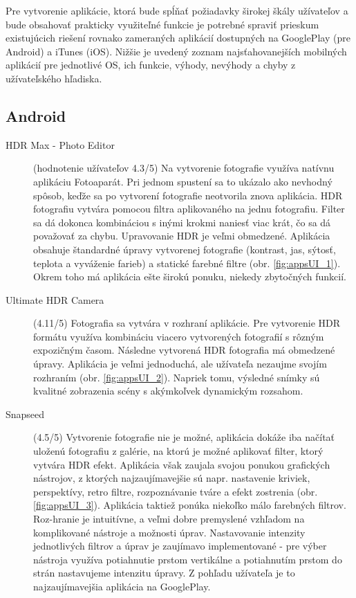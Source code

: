 Pre vytvorenie aplikácie, ktorá bude spĺňať požiadavky širokej škály užívateľov
a bude obsahovať prakticky využiteľné funkcie je potrebné spraviť prieskum existujúcich riešení
rovnako zameraných aplikácií dostupných na GooglePlay (pre Android) a iTunes (iOS).
Nižšie je uvedený zoznam najsťahovanejších mobilných aplikácií pre jednotlivé OS, ich funkcie, výhody,
nevýhody a chyby z užívateľského hľadiska.

\subsection*{Android}

\begin{description}
    \item [HDR Max - Photo Editor] (hodnotenie užívateľov 4.3/5)
    Na vytvorenie fotografie využíva natívnu aplikáciu Fotoaparát. Pri jednom spustení sa to ukázalo ako
    nevhodný spôsob, keďže sa po vytvorení fotografie neotvorila znova aplikácia. HDR fotografiu vytvára 
    pomocou filtra aplikovaného na jednu fotografiu. Filter sa dá dokonca kombináciou s inými krokmi naniesť 
    viac krát, čo sa dá považovať za chybu. Upravovanie HDR je veľmi obmedzené. Aplikácia obsahuje štandardné 
    úpravy vytvorenej fotografie (kontrast, jas, sýtosť, teplota a vyváženie farieb) a statické farebné filtre
    (obr. \ref{fig:appsUI_1}). Okrem toho má aplikácia ešte širokú ponuku, niekedy zbytočných funkcií.

    \item [Ultimate HDR Camera] (4.11/5)
    Fotografia sa vytvára v rozhraní aplikácie. Pre vytvorenie HDR formátu využíva kombináciu viacero vytvorených
    fotografií s rôzným expozičným časom. Následne vytvorená HDR fotografia má obmedzené úpravy. Aplikácia je
    veľmi jednoduchá, ale užívateľa nezaujme svojím rozhraním (obr. \ref{fig:appsUI_2}). Napriek tomu, výsledné snímky
    sú kvalitné zobrazenia scény s akýmkoľvek dynamickým rozsahom.

    \item [Snapseed] (4.5/5)
    Vytvorenie fotografie nie je možné, aplikácia dokáže iba načítať uloženú fotografiu z galérie, na ktorú je
    možné aplikovať filter, ktorý vytvára HDR efekt. Aplikácia však zaujala svojou ponukou grafických nástrojov,
    z ktorých najzaujímavejšie sú napr. nastavenie kriviek, perspektívy, retro filtre, rozpoznávanie tváre
    a efekt zostrenia (obr. \ref{fig:appsUI_3}). Aplikácia taktiež ponúka niekoľko málo farebných filtrov. Roz-hranie
    je intuitívne, a veľmi dobre premyslené vzhľadom na komplikované nástroje a možnosti úprav. Nastavovanie intenzity
    jednotlivých filtrov a úprav je zaujímavo implementované - pre výber nástroja využíva potiahnutie prstom vertikálne
    a potiahnutím prstom do strán nastavujeme intenzitu úpravy. Z pohľadu užívateľa je to najzaujímavejšia aplikácia
    na GooglePlay.


\end{description}
